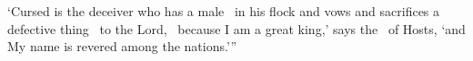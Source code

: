 \begin{inparaenum}
   `Cursed is the deceiver who has a male\
  in his flock and vows and sacrifices a defective thing\
  to the Lord,\
  because I am a great king,' says the \lord\ of Hosts, `and My name is revered among the nations.'\thinspace''%
\end{inparaenum}
